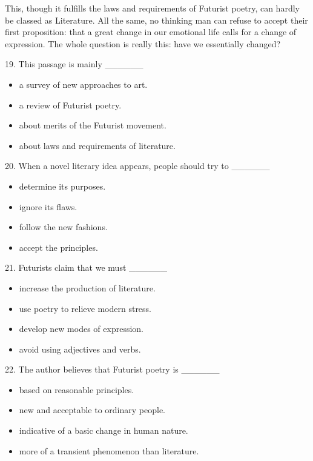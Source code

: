 \documentclass[UTF8,11pt]{ctexart}
\begin{document}
This, though it fulfills the laws and requirements of Futurist poetry, can hardly be classed as Literature. All the same, no thinking man can refuse to accept their first proposition: that a great change in our emotional life calls for a change of expression. The whole question is really this: have we essentially changed?


19. This passage is mainly \_\_\_\_\_\_


\begin{itemize}[leftmargin=2em,itemsep=.2em,topsep=.4em]\item[A.] a survey of new approaches to art.
\item[B.] a review of Futurist poetry.
\item[C.] about merits of the Futurist movement.
\item[D.] about laws and requirements of literature.
\end{itemize}

20. When a novel literary idea appears, people should try to \_\_\_\_\_\_


\begin{itemize}[leftmargin=2em,itemsep=.2em,topsep=.4em]\item[A.] determine its purposes.
\item[B.] ignore its flaws.
\item[C.] follow the new fashions.
\item[D.] accept the principles.
\end{itemize}

21. Futurists claim that we must \_\_\_\_\_\_


\begin{itemize}[leftmargin=2em,itemsep=.2em,topsep=.4em]\item[A.] increase the production of literature.
\item[B.] use poetry to relieve modern stress.
\item[C.] develop new modes of expression.
\item[D.] avoid using adjectives and verbs.
\end{itemize}

22. The author believes that Futurist poetry is \_\_\_\_\_\_


\begin{itemize}[leftmargin=2em,itemsep=.2em,topsep=.4em]\item[A.] based on reasonable principles.
\item[B.] new and acceptable to ordinary people.
\item[C.] indicative of a basic change in human nature.
\item[D.] more of a transient phenomenon than literature.
\end{itemize}
\end{document}
